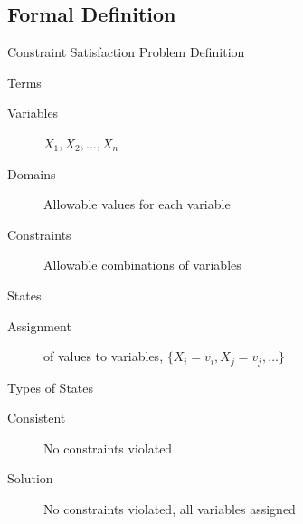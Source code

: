 \documentclass[12pt]{beamer}
\begin{document}
\subsection{Formal Definition}
\begin{frame}{Constraint Satisfaction Problem Definition}
	\begin{block}{Terms}
		\begin{description}
			\item[Variables] $X_1, X_2, \ldots, X_n$
			\item[Domains] Allowable values for each variable
			\item[Constraints] Allowable combinations of variables
		\end{description}
	\end{block}
	\begin{block}{States}
		\begin{description}
			\item[Assignment] of values to variables, $\{X_i=v_i, X_j=v_j, \ldots\}$
		\end{description}
	\end{block}
	\begin{block}{Types of States}
		\begin{description}
			\item[Consistent] No constraints violated
			\item[Solution] No constraints violated, all variables assigned
		\end{description}
	\end{block}
\end{frame}
\end{document}
